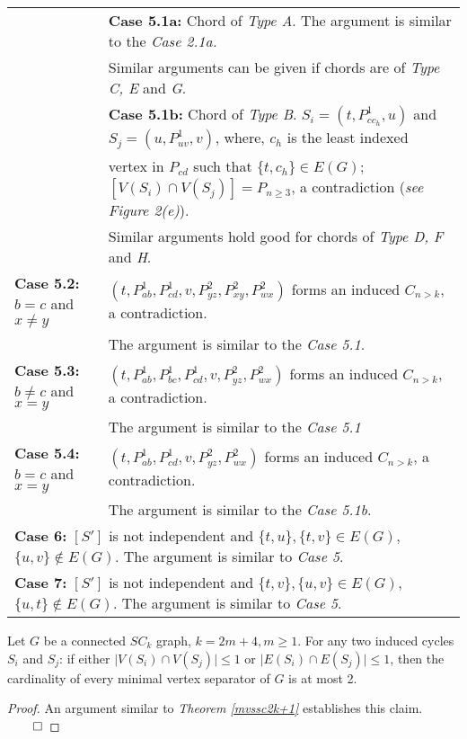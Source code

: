 \documentclass[runningheads]{llncs}
\begin{document}
\begin{table}[H]
\begin{tabular}{|l|l|}
& \textbf{Case 5.1a:} Chord of \emph{Type A}.  The argument is similar to the \emph{Case 2.1a.} \\ & Similar arguments can be given if chords are of \emph{Type C, E} and \emph{G}. \\ \cline{2-2}
& \textbf{Case 5.1b:} Chord of \emph{Type B}. $S_i=(t,P_{cc_h}^{1},u)$ and $S_j=(u,P_{uv}^{1},v)$, where, $c_h$ is the least indexed \\ 
 &vertex in $P_{cd}$ such that $\{t,c_h\} \in E(G)$; $[V(S_i)\cap V(S_j)] = P_{n \geq 3}$, a contradiction (\emph{see Figure 2(e)}). \\ 
 & Similar arguments hold good for chords of \emph{Type D, F} and \emph{H}. \\ \hline  
\textbf{Case 5.2:} $b=c$ and $x \neq y$ &  $(t, P_{ab}^{1}, P_{cd}^{1}, v, P_{yz}^{2}, P_{xy}^{2}, P_{wx}^{2})$ forms an induced $C_{n >k}$, a contradiction. \\
& The argument is similar to the \emph{Case 5.1}.\\
 \hline
\textbf{Case 5.3:} $b \neq c$ and $x = y$ &  $(t, P_{ab}^{1}, P_{bc}^{1}, P_{cd}^{1}, v, P_{yz}^{2}, P_{wx}^{2})$ forms an induced $C_{n >k}$, a contradiction. \\
& The argument is similar to the \emph{Case 5.1}\\
 \hline
\textbf{Case 5.4:} $b = c$ and $x = y$ &  $(t, P_{ab}^{1}, P_{cd}^{1}, v, P_{yz}^{2}, P_{wx}^{2})$  forms an induced $C_{n >k}$, a contradiction. \\ 
& The argument is similar to the \emph{Case 5.1b}.\\
 \hline
\multicolumn{2}{|l|}{\textbf{Case 6:} $[S']$ is not independent and $\{t,u\},\{t,v\} \in E(G)$, $\{u,v\} \notin E(G)$. The argument is similar to \emph{Case 5}. }\\ \hline
\multicolumn{2}{|l|}{\textbf{Case 7:} $[S']$ is not independent and $\{t,v\},\{u,v\} \in E(G)$, $\{u,t\} \notin E(G)$. The argument is similar to \emph{Case 5}. }\\ \hline
\end{tabular}
\end{table}



\begin{lemma}
\label{mvssck}
Let $G$ be a connected $SC_k$ graph, $k=2m+4, m \geq 1$. For any two induced cycles $S_i$ and $S_j$: if either $\vert V(S_i) \cap V(S_j) \vert \leq 1$ or $\vert E(S_i) \cap E(S_j) \vert \leq 1$, then the cardinality of every minimal vertex separator of $G$ is at most 2.
\end{lemma}
\begin{proof}
An argument similar to \emph{Theorem \ref{mvssc2k+1}} establishes this claim. $\hfill \qed$
\end{proof}
\end{document}
